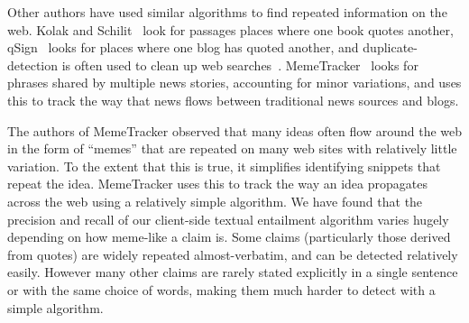 \documentclass{www2010-submission}
\newcommand{\todo}[1]{}
\begin{document}
\todo{Mention that we could add the +ve and -ve n-grams to the client code? Actually do this?}

\todo{Discuss how and why this is simpler than the server-side classification method}
\todo{Explain how we avoid downloading the entire database}

\todo{Should we have a version where the interface merely suggests n-grams that should be used by the classifier}
\todo{Can we present all these systems without giving detailed stats about how they compare?}
\todo{Add support for a user to enter 'anti-phrases' when a snippet is wrongly highlighted}
\todo{Add support for a user to enter a paraphrase that will match the snippet they are looking at}
\todo{Do a load more people in a final user-study round. Try to get it up to 8.}
\todo{Explain how our algorithm relates to existing NLP work - due to unusual domain}


Other authors have used similar algorithms to find repeated information on the web. Kolak and Schilit~\cite{Kolak2008} look for passages places where one book quotes another, qSign~\cite{Kim2009} looks for places where one blog has quoted another, and duplicate-detection is often used to clean up web searches~\cite{Theobald2008}. MemeTracker~\cite{Backstrom2009} looks for phrases shared by multiple news stories, accounting for minor variations, and uses this to track the way that news flows between traditional news sources and blogs.

The authors of MemeTracker observed that many ideas often flow around the web in the form of ``memes'' that are repeated on many web sites with relatively little variation. To the extent that this is true, it simplifies identifying snippets that repeat the idea. MemeTracker uses this to track the way an idea propagates across the web using a relatively simple algorithm. We have found that the precision and recall of our client-side textual entailment algorithm varies hugely depending on how meme-like a claim is. Some claims (particularly those derived from quotes) are widely repeated almost-verbatim, and can be detected relatively easily. However many other claims are rarely stated explicitly in a single sentence or with the same choice of words, making them much harder to detect with a simple algorithm.

\todo{Give an example of a good meme}

\todo{Talk about what dispute finder does, and how it differs - maybe by moving this into the main system section}
\todo{Cite plagarism detection}
\todo{Talk about how our algorithm looks for key terms used in disputed claims}
\todo{Talk about how our first pass NLP algo is rather like }
\end{document}
